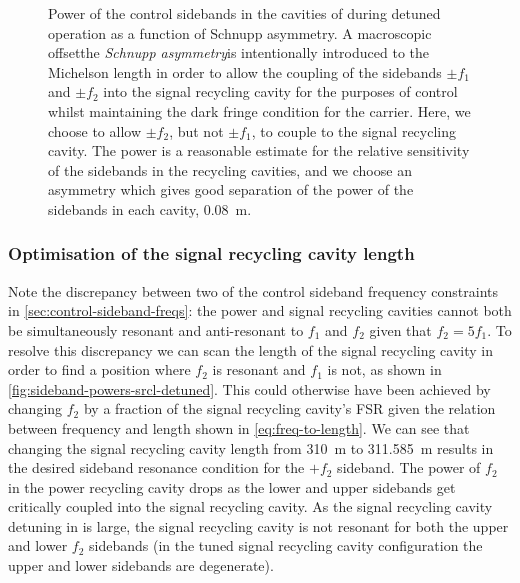 \begin{figure}
  \centering
  
  \caption[Power of the control sidebands in the cavities of \ETLF{} in detuned configuration as a function of Schnupp asymmetry]{\label{fig:sideband-powers-vs-schnupp-detuned}Power of the control sidebands in the cavities of \ETLF{} during detuned operation as a function of Schnupp asymmetry. A macroscopic offset\textemdash the \emph{Schnupp asymmetry}\textemdash is intentionally introduced to the Michelson length in order to allow the coupling of the sidebands $\pm f_1$ and $\pm f_2$ into the signal recycling cavity for the purposes of control whilst maintaining the dark fringe condition for the carrier. Here, we choose to allow $\pm f_2$, but not $\pm f_1$, to couple to the signal recycling cavity. The power is a reasonable estimate for the relative sensitivity of the sidebands in the recycling cavities, and we choose an asymmetry which gives good separation of the power of the sidebands in each cavity, \SI{0.08}{\meter}.}
\end{figure}

\subsubsection{Optimisation of the signal recycling cavity length}
Note the discrepancy between two of the control sideband frequency constraints in \cref{sec:control-sideband-freqs}: the power and signal recycling cavities cannot both be simultaneously resonant and anti-resonant to $f_1$ and $f_2$ given that $f_2 = 5 f_1$. To resolve this discrepancy we can scan the length of the signal recycling cavity in order to find a position where $f_2$ is resonant and $f_1$ is not, as shown in \cref{fig:sideband-powers-srcl-detuned}. This could otherwise have been achieved by changing $f_2$ by a fraction of the signal recycling cavity's \gls{FSR} given the relation between frequency and length shown in \cref{eq:freq-to-length}. We can see that changing the signal recycling cavity length from \SI{310}{\meter} to \SI{311.585}{\meter} results in the desired sideband resonance condition for the $+f_2$ sideband. The power of $f_2$ in the power recycling cavity drops as the lower and upper sidebands get critically coupled into the signal recycling cavity. As the signal recycling cavity detuning in \ETLF{} is large, the signal recycling cavity is not resonant for both the upper and lower $f_2$ sidebands (in the tuned signal recycling cavity configuration the upper and lower sidebands are degenerate).

